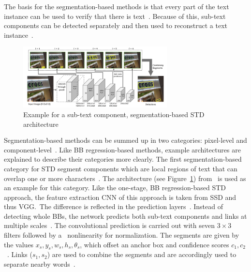 The basis for the segmentation-based methods is that every part of the text instance can
be used to verify that there is text~\citep{long_scene_2021}.
Because of this, sub-text components can be detected separately and then used to reconstruct a text
instance~\citep{long_scene_2021}.
\begin{figure}[b]
    \centering
    \includegraphics[width=0.7\textwidth]{img/STD-seg-based-architecture-Shi-Detecting-2017.png}
    \caption[Sub-text component, segmentation-based STD architecture]{%
        Example for a sub-text component, segmentation-based STD
        architecture~\citep{shi_detecting_2017}\label{fig:STD-segbased-component-architecture}
    }
\end{figure}
Segmentation-based methods can be summed up in two categories: pixel-level and
component-level~\citep{long_scene_2021}.
Like \ac{BB} regression-based methods, example architectures are explained to
describe their categories more clearly.
The first segmentation-based category for \ac{STD} segment components which are local regions of
text that can overlap one or more characters~\citep{long_scene_2021}.
The architecture (see Figure~\ref{fig:STD-segbased-component-architecture})
from~\cite{shi_detecting_2017} is used as an example for this category.
Like the one-stage, \ac{BB} regression-based \ac{STD} approach, the feature extraction \ac{CNN} of
this approach is taken from \ac{SSD} and thus VGG.\
The difference is reflected in the prediction
layers~\citep{shi_detecting_2017,liu_ssd_2016,simonyan_very_2015}.
Instead of detecting whole \acp{BB}, the network predicts both sub-text components and links at
multiple scales~\citep{shi_detecting_2017}.
The convolutional prediction is carried out with seven $3\times3$ filters followed by a \sfmx\
nonlinearity for normalization.
The segments are given by the values $x_s,y_s,w_s,h_s,\theta_s$, which offset an anchor box and
confidence scores $c_1,c_2$~\citep{shi_detecting_2017}.
Links ($s_1,s_2$) are used to combine the segments and are accordingly used to separate nearby
words~\citep{shi_detecting_2017}.
